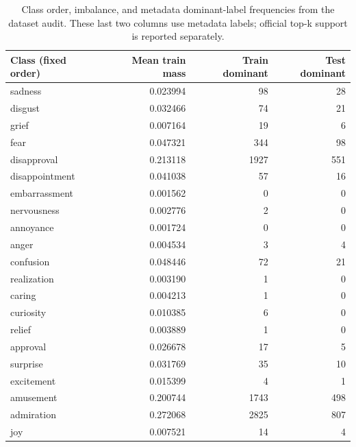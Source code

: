 \begin{table}[!htbp]
\centering
\small
\setlength{\tabcolsep}{5pt}
\begin{tabular}{lrrr}
\toprule
Class (fixed order) & Mean train mass & Train dominant & Test dominant \\
\midrule
sadness & 0.023994 & 98 & 28 \\
disgust & 0.032466 & 74 & 21 \\
grief & 0.007164 & 19 & 6 \\
fear & 0.047321 & 344 & 98 \\
disapproval & 0.213118 & 1927 & 551 \\
disappointment & 0.041038 & 57 & 16 \\
embarrassment & 0.001562 & 0 & 0 \\
nervousness & 0.002776 & 2 & 0 \\
annoyance & 0.001724 & 0 & 0 \\
anger & 0.004534 & 3 & 4 \\
confusion & 0.048446 & 72 & 21 \\
realization & 0.003190 & 1 & 0 \\
caring & 0.004213 & 1 & 0 \\
curiosity & 0.010385 & 6 & 0 \\
relief & 0.003889 & 1 & 0 \\
approval & 0.026678 & 17 & 5 \\
surprise & 0.031769 & 35 & 10 \\
excitement & 0.015399 & 4 & 1 \\
amusement & 0.200744 & 1743 & 498 \\
admiration & 0.272068 & 2825 & 807 \\
joy & 0.007521 & 14 & 4 \\
\bottomrule
\end{tabular}
\caption{Class order, imbalance, and metadata dominant-label frequencies from the dataset audit. These last two columns use metadata labels; official top-k support is reported separately.}
\label{tab:taxonomy}
\end{table}
